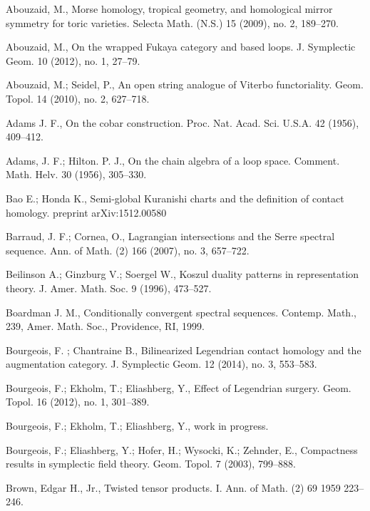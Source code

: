 \documentclass{gtpart}
\begin{document}
\begin{thebibliography}{9999}

 Abouzaid, M., Morse homology, tropical geometry, and homological mirror
        symmetry for toric varieties. Selecta Math. (N.S.) 15 (2009), no. 2, 189--270. 
        
Abouzaid, M., On the wrapped Fukaya category and based loops. J. Symplectic Geom. 10 (2012), no. 1, 27--79.        

 Abouzaid, M.; Seidel, P., An open string analogue of Viterbo functoriality. Geom. Topol. 14 (2010), no. 2, 627--718. 

 Adams J. F., On the cobar construction. Proc. Nat. Acad. Sci. U.S.A. 42 (1956), 409--412. 

 Adams, J. F.; Hilton. P. J., On the chain algebra of a loop space.
Comment. Math. Helv. 30 (1956), 305--330. 

 Bao E.; Honda K., Semi-global Kuranishi charts and the definition of contact
    homology. preprint arXiv:1512.00580


 Barraud, J. F.; Cornea, O., Lagrangian intersections and the Serre spectral sequence. Ann. of Math. (2) 166 (2007), no. 3, 657--722.

    Beilinson A.; Ginzburg V.; Soergel W., Koszul duality patterns in representation theory.
        J. Amer. Math. Soc.  9 (1996), 473--527.

  Boardman J. M., Conditionally convergent spectral sequences. 
Contemp. Math., 239, Amer. Math. Soc., Providence, RI, 1999. 

 Bourgeois, F. ; Chantraine B., Bilinearized Legendrian contact homology and the augmentation category. J. Symplectic Geom. 12 (2014), no. 3, 553--583.
   
   
	Bourgeois, F.; Ekholm, T.; Eliashberg, Y., 
	Effect of Legendrian surgery. Geom. Topol. 16 (2012), no. 1, 301--389.

	Bourgeois, F.; Ekholm, T.; Eliashberg, Y.,
	work in progress.

   Bourgeois, F.; Eliashberg, Y.; Hofer, H.; Wysocki, K.; Zehnder, E., Compactness results in symplectic field theory. Geom. Topol. 7 (2003), 799--888.
 
 Brown, Edgar H., Jr., Twisted tensor products. I. Ann. of Math. (2) 69 1959 223--246. 



\end{thebibliography}
\end{document}

